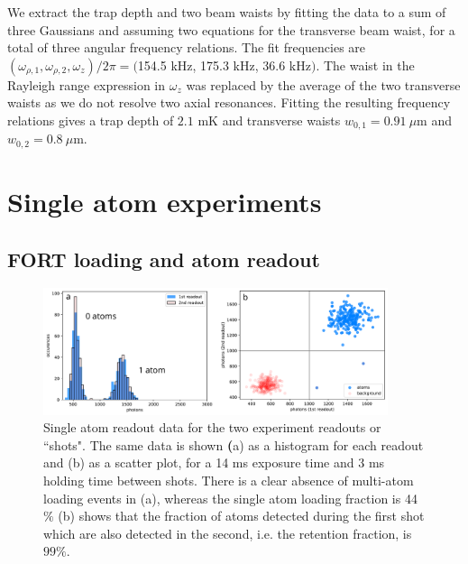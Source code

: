 We extract the trap depth and two beam waists by fitting the data to a sum of three Gaussians and assuming two equations for the transverse beam waist, for a total of three angular frequency relations. The fit frequencies are $(\omega_{\rho,1}, \omega_{\rho,2}, \omega_{z})/2\pi=($154.5 kHz, 175.3 kHz, 36.6 kHz$)$. The waist in the Rayleigh range expression in $\omega_z$ was replaced by the average of the two transverse waists as we do not resolve two axial resonances. Fitting the resulting frequency relations gives a trap depth of $2.1$ mK and transverse waists $w_{0,1}=0.91 ~\mu$m and $w_{0,2}=0.8 ~\mu$m.

\section{Single atom experiments}\label{sec:singleatomexperiments}

\subsection{FORT loading and atom readout}\label{sec:fort_loading}


\begin{figure}[!ht]
    \centering
    \includegraphics[width=0.9\textwidth]{Images/atom_histogram_and_scatterplot.pdf}
    \caption{Single atom readout data for the two experiment readouts or ``shots". The same data is shown \textbf({a}) as a histogram for each readout and (b) as a scatter plot, for a 14 ms exposure time and 3 ms holding time between shots. There is a clear absence of multi-atom loading events in (a), whereas the single atom loading fraction is 44$\%$ (b) shows that the fraction of atoms detected during the first shot which are also detected in the second, i.e. the retention fraction, is $99\%$.}
    \label{fig:atom_histogram}
\end{figure}

